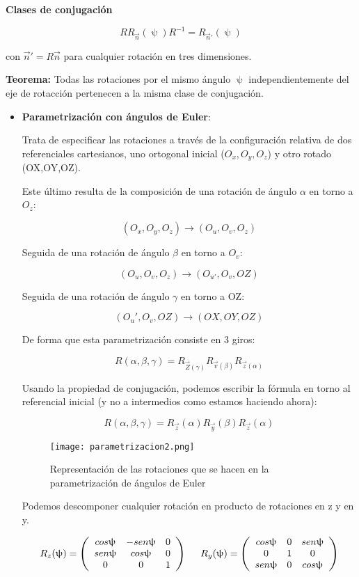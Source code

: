 \newpage
\textbf{Clases de conjugación}

$$RR_{\Vec{n}}(\uppsi ) R^{-1} = R_{\Vec{n}'}(\uppsi)$$

con $\Vec{n}'=R\Vec{n}$ para cualquier rotación en tres dimensiones.

\smallskip
\textbf{Teorema:} Todas las rotaciones por el mismo ángulo $\uppsi$ independientemente del eje de rotacción pertenecen a la misma clase de conjugación.

\begin{itemize}
\item \textbf{Parametrización con ángulos de Euler}:

Trata de especificar las rotaciones a través de la configuración relativa de dos referenciales cartesianos, uno ortogonal inicial ($O_x,O_y,O_z$) y otro rotado (OX,OY,OZ).

Este último resulta de la composición de una rotación de ángulo $\alpha$ en torno a $O_z$:

$$ (O_x,O_y,O_z) \longrightarrow (O_u,O_v,O_z)$$

Seguida de una rotación de ángulo $\beta$ en torno a $O_v$:

$$(O_u,O_v,O_z) \longrightarrow (O_{u'},O_v,OZ)$$

Seguida de una rotación de ángulo $\gamma$ en torno a OZ:

$$(O_u',O_v,OZ) \longrightarrow (OX,OY,OZ)$$

De forma que esta parametrización consiste en 3 giros:

$$R(\alpha, \beta , \gamma)=R_{\Vec{Z}(\gamma)}R_{\Vec{v}(\beta)}R_{\Vec{z}(\alpha)}$$

Usando la propiedad de conjugación, podemos escribir la fórmula en torno al referencial inicial (y no a intermedios como estamos haciendo ahora):

$$R(\alpha, \beta , \gamma)=R_{\Vec{z}}(\alpha)R_{\Vec{y}}(\beta)R_{\Vec{z}}(\alpha)$$

\begin{figure}[h!]
    \centering
 \texttt{[image: parametrizacion2.png]}
    \caption{Representación de las rotaciones que se hacen en la parametrización de ángulos de Euler}
    \label{fig:my_label}
\end{figure}

\newpage
Podemos descomponer cualquier rotación en producto de rotaciones en z y en y.

$$R_{z}(\uppsi )=\left ( \begin{array}{ccc}
     cos \uppsi & -sen \uppsi  & 0 \\
     sen \uppsi & cos \uppsi & 0 \\
     0 & 0 & 1
\end{array}\right) \hspace{0.5cm} R_{y}(\uppsi )=\left ( \begin{array}{ccc}
     cos \uppsi & 0 & sen \uppsi \\
     0 & 1 & 0 \\
     sen \uppsi & 0 & cos \uppsi
\end{array}\right)$$
\end{itemize}

